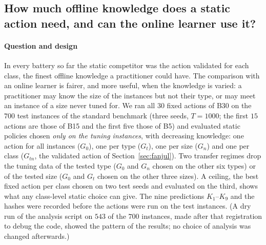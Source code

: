 \subsection{How much offline knowledge does a static action need, and can the online learner use it?}
\label{sec:granularity}
\paragraph{Question and design} In every battery so far the static competitor was the action validated for each class, the finest offline knowledge a practitioner could have. The comparison with an online learner is fairer, and more useful, when the knowledge is varied: a practitioner may know the size of the instances but not their type, or may meet an instance of a size never tuned for. We ran all $30$ fixed actions of B30 on the $700$ test instances of the standard benchmark (three seeds, $T=1000$; the first $15$ actions are those of B15 and the first five those of B5) and evaluated static policies chosen \emph{only on the tuning instances}, with decreasing knowledge: one action for all instances ($G_0$), one per type ($G_t$), one per size ($G_n$) and one per class ($G_{tn}$, the validated action of Section~\ref{sec:fanjul}). Two transfer regimes drop the tuning data of the tested type ($G_0$ and $G_n$ chosen on the other six types) or of the tested size ($G_0$ and $G_t$ chosen on the other three sizes). A ceiling, the best fixed action per class chosen on two test seeds and evaluated on the third, shows what any class-level static choice can give. The nine predictions $K_1$--$K_9$ and the hashes were recorded before the actions were run on the test instances. (A dry run of the analysis script on $543$ of the $700$ instances, made after that registration to debug the code, showed the pattern of the results; no choice of analysis was changed afterwards.)

